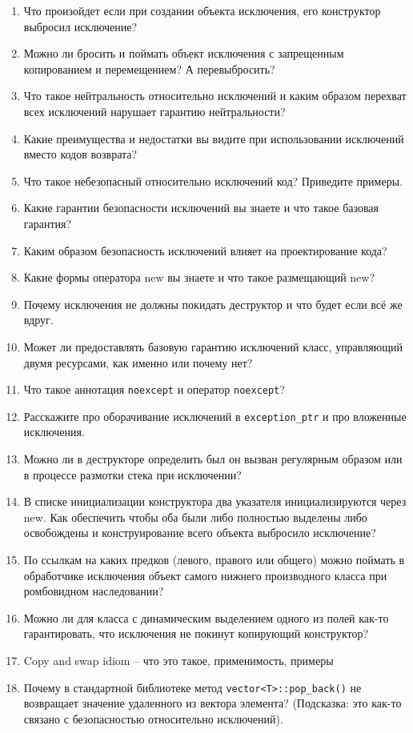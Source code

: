 \documentclass[a4paper,12pt,oneside]{book}
\begin{document}
\begin{enumerate}
\item Что произойдет если при создании объекта исключения, его конструктор выбросил исключение?
\item Можно ли бросить и поймать объект исключения с запрещенным копированием и перемещением? А перевыбросить?
\item Что такое нейтральность относительно исключений и каким образом перехват всех исключений нарушает гарантию нейтральности?
\item Какие преимущества и недостатки вы видите при использовании исключений вместо кодов возврата?
\item Что такое небезопасный относительно исключений код? Приведите примеры.
\item Какие гарантии безопасности исключений вы знаете и что такое базовая гарантия?
\item Каким образом безопасность исключений влияет на проектирование кода?
\item Какие формы оператора new вы знаете и что такое размещающий new?
\item Почему исключения не должны покидать деструктор и что будет если всё же вдруг.
\item Может ли предоставлять базовую гарантию исключений класс, управляющий двумя ресурсами, как именно или почему нет?
\item Что такое аннотация \lstinline!noexcept! и оператор \lstinline!noexcept!?
\item Расскажите про оборачивание исключений в \lstinline!exception_ptr! и про вложенные исключения.
\item Можно ли в деструкторе определить был он вызван регулярным образом или в процессе размотки стека при исключении?
\item В списке инициализации конструктора два указателя инициализируются через new. Как обеспечить чтобы оба были либо полностью выделены либо освобождены и конструирование всего объекта выбросило исключение?
\item По ссылкам на каких предков (левого, правого или общего) можно поймать в обработчике исключения объект самого нижнего производного класса при ромбовидном наследовании?
\item Можно ли для класса с динамическим выделением одного из полей как-то гарантировать, что исключения не покинут копирующий конструктор?
\item Copy and swap idiom -- что это такое, применимость, примеры
\item Почему в стандартной библиотеке метод \lstinline!vector<T>::pop_back()! не возвращает значение удаленного из вектора элемента? (Подсказка: это как-то связано с безопасностью относительно исключений).

\end{enumerate}
\end{document}
